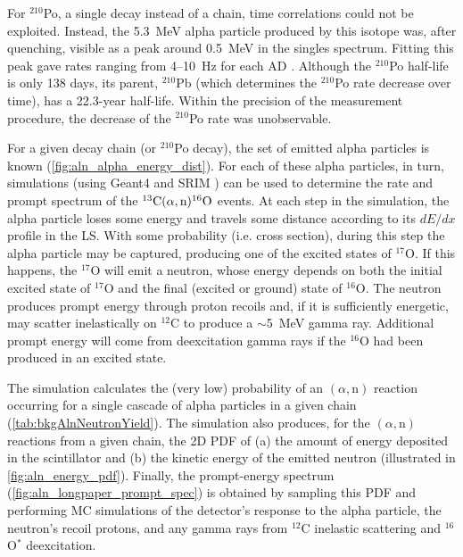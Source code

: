 \documentclass[../thesis.tex]{subfiles}
\begin{document}
For $^{210}$Po, a single decay instead of a chain, time correlations could not be exploited. Instead, the 5.3~MeV alpha particle produced by this isotope was, after quenching, visible as a peak around 0.5~MeV in the singles spectrum. Fitting this peak gave rates ranging from 4--10~Hz for each AD \cite{zeyuanAln}. Although the $^{210}$Po half-life is only 138 days, its parent, $^{210}$Pb (which determines the $^{210}$Po rate decrease over time), has a 22.3-year half-life. Within the precision of the measurement procedure, the decrease of the $^{210}$Po rate was unobservable.

For a given decay chain (or $^{210}$Po decay), the set of emitted alpha particles is known (\autoref{fig:aln_alpha_energy_dist}). For each of these alpha particles, in turn, simulations (using Geant4 \cite{Geant4} and SRIM \cite{SRIM}) can be used to determine the rate and prompt spectrum of the $^{13}\mathrm{C}(\alpha, \mathrm{n})^{16}\mathrm{O}$ events. At each step in the simulation, the alpha particle loses some energy and travels some distance according to its $dE/dx$ profile in the LS. With some probability (i.e. cross section), during this step the alpha particle may be captured, producing one of the excited states of $^{17}$O. If this happens, the $^{17}$O will emit a neutron, whose energy depends on both the initial excited state of $^{17}$O and the final (excited or ground) state of $^{16}$O. The neutron produces prompt energy through proton recoils and, if it is sufficiently energetic, may scatter inelastically on $^{12}$C to produce a $\sim$5~MeV gamma ray. Additional prompt energy will come from deexcitation gamma rays if the $^{16}$O had been produced in an excited state.

The simulation calculates the (very low) probability of an $(\alpha,\mathrm{n})$ reaction occurring for a single cascade of alpha particles in a given chain (\autoref{tab:bkgAlnNeutronYield}). The simulation also produces, for the $(\alpha,\mathrm{n})$ reactions from a given chain, the 2D PDF of (a) the amount of energy deposited in the scintillator and (b) the kinetic energy of the emitted neutron (illustrated in \autoref{fig:aln_energy_pdf}). Finally, the prompt-energy spectrum (\autoref{fig:aln_longpaper_prompt_spec}) is obtained by sampling this PDF and performing MC simulations of the detector's response to the alpha particle, the neutron's recoil protons, and any gamma rays from $^{12}$C inelastic scattering and $^{16}$O$^*$ deexcitation.
\end{document}
